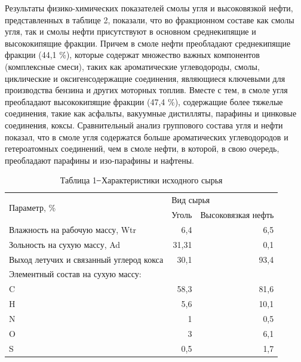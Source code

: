 \begin{multicols}{2}
Результаты физико-химических показателей смолы угля и высоковязкой
нефти, представленных в таблице 2, показали, что во фракционном составе
как смолы угля, так и смолы нефти присутствуют в основном среднекипящие
и высококипящие фракции. Причем в смоле нефти преобладают среднекипящие
фракции (44,1 \%), которые содержат множество важных компонентов
(комплексные смеси), таких как ароматические углеводороды, смолы,
циклические и оксигенсодержащие соединения, являющиеся ключевыми для
производства бензина и других моторных топлив. Вместе с тем, в смоле
угля преобладают высококипящие фракции (47,4 \%), содержащие более
тяжелые соединения, такие как асфальты, вакуумные дистилляты, парафины и
цинковые соединения, коксы. Сравнительный анализ группового состава угля
и нефти показал, что в смоле угля содержатся больше ароматических
углеводородов и гетероатомных соединений, чем в смоле нефти, в которой,
в свою очередь, преобладают парафины и изо-парафины и нафтены.
\end{multicols}

\begin{table}[H]
\caption*{Таблица 1 ̶ Характеристики исходного сырья}
\centering
\begin{tabular}{|l|rr|}
\hline
\multirow{2}{*}{Параметр, \%}           & \multicolumn{2}{l|}{Вид сырья}                                       \\ \cline{2-3} 
                                        & \multicolumn{1}{l|}{Уголь} & \multicolumn{1}{l|}{Высоковязкая нефть} \\ \hline
Влажность на рабочую массу, Wtr         & \multicolumn{1}{r|}{6,4}   & 6,5                                     \\ \hline
Зольность на сухую массу, Ad            & \multicolumn{1}{r|}{31,31} & 0,1                                     \\ \hline
Выход летучих и связанный углерод кокса & \multicolumn{1}{r|}{30,1}  & 93,4                                    \\ \hline
Элементный состав на сухую массу:       & \multicolumn{1}{l|}{}      & \multicolumn{1}{l|}{}                   \\ \hline
C                                       & \multicolumn{1}{r|}{58,3}  & 81,6                                    \\ \hline
H                                       & \multicolumn{1}{r|}{5,6}   & 10,1                                    \\ \hline
N                                       & \multicolumn{1}{r|}{1}     & 0,5                                     \\ \hline
O                                       & \multicolumn{1}{r|}{3}     & 6,1                                     \\ \hline
S                                       & \multicolumn{1}{r|}{0,5}   & 1,7                                     \\ \hline
\end{tabular}
\end{table}


